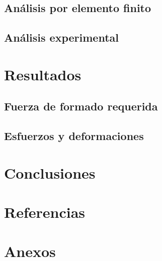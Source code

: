 \documentclass[12pt,letterpaper]{book}
\begin{document}
\section{Análisis por elemento finito}
\section{Análisis experimental}


\chapter{Resultados}
\section{Fuerza de formado requerida}
\section{Esfuerzos y deformaciones}



\chapter*{Conclusiones}

\chapter*{Referencias}

\chapter*{Anexos}


% 
% 
% 
\end{document}
